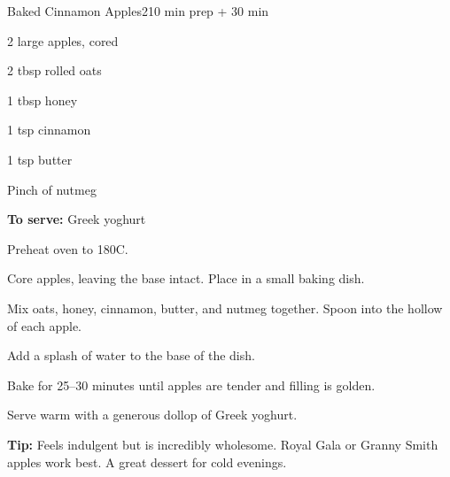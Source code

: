 \begin{recipebox}{Baked Cinnamon Apples}{2}{10 min prep + 30 min}
\begin{ingredients}
  \item 2 large apples, cored
  \item 2 tbsp rolled oats
  \item 1 tbsp honey
  \item 1 tsp cinnamon
  \item 1 tsp butter
  \item Pinch of nutmeg
  \item \textbf{To serve:} Greek yoghurt
\end{ingredients}

\begin{method}
  \item Preheat oven to 180\textdegree C.
  \item Core apples, leaving the base intact. Place in a small baking dish.
  \item Mix oats, honey, cinnamon, butter, and nutmeg together. Spoon into the hollow of each apple.
  \item Add a splash of water to the base of the dish.
  \item Bake for 25--30 minutes until apples are tender and filling is golden.
  \item Serve warm with a generous dollop of Greek yoghurt.
\end{method}

\begin{notelist}
  \item \textbf{Tip:} Feels indulgent but is incredibly wholesome. Royal Gala or Granny Smith apples work best. A great dessert for cold evenings.
\end{notelist}
\end{recipebox}
